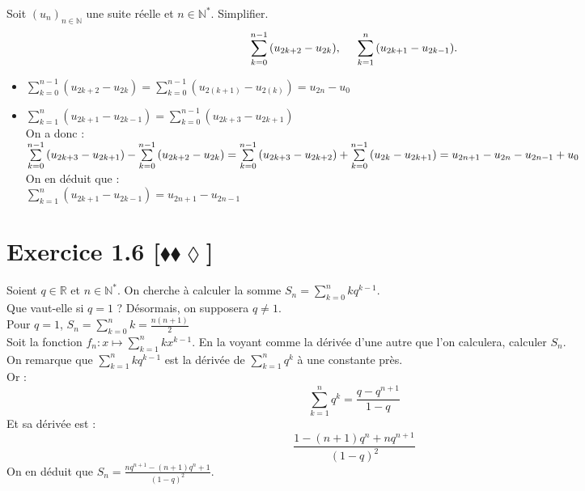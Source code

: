 \documentclass[10pt]{article}
\begin{document}
\begin{tcolorbox}[enhanced, width=6in, center, size=fbox, fontupper=\large, drop shadow southwest]
    Soit $(u_n)_{n\in\mathbb{N}}$ une suite réelle et $n\in\mathbb{N}^*$. Simplifier.
    \begin{equation*}
        \sum\limits^{n-1}_{k=0}{(u_{2k+2}-u_{2k})}, \hspace{0.5cm} \sum\limits^{n}_{k=1}{(u_{2k+1}-u_{2k-1})}.
    \end{equation*}
    \begin{itemize}
        \item $\sum\limits^{n-1}_{k=0}{(u_{2k+2}-u_{2k})}=\sum\limits^{n-1}_{k=0}{(u_{2(k+1)}-u_{2(k)})}=u_{2n}-u_0$
        \item $\sum\limits^{n}_{k=1}{(u_{2k+1}-u_{2k-1})}=\sum\limits^{n-1}_{k=0}{(u_{2k+3}-u_{2k+1})}$\\On a donc :\\$\sum\limits^{n-1}_{k=0}{(u_{2k+3}-u_{2k+1})}-\sum\limits^{n-1}_{k=0}{(u_{2k+2}-u_{2k})}\\=\sum\limits^{n-1}_{k=0}{(u_{2k+3}-u_{2k+2})} + \sum\limits^{n-1}_{k=0}{(u_{2k}-u_{2k+1})}\\=u_{2n+1}-u_{2n}-u_{2n-1}+u_{0}$\\On en déduit que :\\$\sum\limits^{n}_{k=1}{(u_{2k+1}-u_{2k-1})}=u_{2n+1}-u_{2n-1}$
    \end{itemize}
\end{tcolorbox}


\section*{Exercice 1.6 [$\blacklozenge\blacklozenge\lozenge$]}

\begin{tcolorbox}[enhanced, width=6in, center, size=fbox, fontupper=\large, drop shadow southwest]
    Soient $q\in\mathbb{R}$ et $n\in\mathbb{N}^*$. On cherche à calculer la somme $S_n=\sum\limits^{n}_{k=0}{kq^{k-1}}$.\\
    Que vaut-elle si $q=1$ ? Désormais, on supposera $q\neq 1$.\\
    Pour $q=1$, $S_n=\sum\limits^{n}_{k=0}{k}=\frac{n(n+1)}{2}$\\
    Soit la fonction $f_n:x\mapsto\sum\limits^{n}_{k=1}{kx^{k-1}}$. En la voyant comme la dérivée d'une autre que l'on calculera, calculer $S_n$.\\
    On remarque que $\sum\limits^{n}_{k=1}{kq^{k-1}}$ est la dérivée de $\sum\limits^{n}_{k=1}{q^k}$ à une constante près.\\
    Or :
    \begin{equation*}
        \sum\limits^{n}_{k=1}{q^k}=\frac{q-q^{n+1}}{1-q}
    \end{equation*}
    Et sa dérivée est :
    \begin{equation*}
        \frac{1-(n+1)q^n+nq^{n+1}}{(1-q)^2}
    \end{equation*}
    On en déduit que $S_n=\frac{nq^{n+1}-(n+1)q^n+1}{(1-q)^2}$.
\end{tcolorbox}
\end{document}
